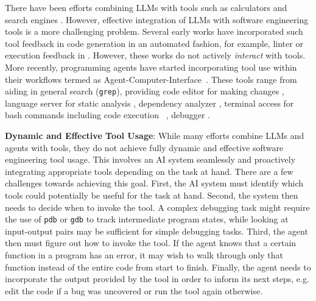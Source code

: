 There have been efforts combining LLMs with tools such as calculators and search engines \citep{schick2023toolformer, patil2023gorilla}. 
However, effective integration of LLMs with software engineering tools is a more challenging problem. 
Several early works have incorporated such tool feedback in code generation in an automated fashion, for example, linter or execution feedback in \citep{olausson2023self, zhong2024ldb, gehring2024rlef}.
However, these works do not actively \textit{interact} with tools. 
More recently, programming agents have started incorporating tool use within their workflows termed as Agent-Computer-Interface~\citep{yang2024sweagent}. 
These tools range from aiding in general search (\texttt{grep}), providing code editor for making changes \citep{openhands,claude35swebench}, language server for static analysis \citep{liu2024marscode},
dependency analyzer \citep{bairi2024codeplan}, terminal access for bash commands including code execution ~\citep{yang2024sweagent}, debugger \citep{bigsleep}. 



\textbf{Dynamic and Effective Tool Usage}: While many efforts combine LLMs and agents with tools, they do not achieve fully dynamic and effective software engineering tool usage. This involves an AI system seamlessly and proactively integrating appropriate tools depending on the task at hand. There are a few challenges towards achieving this goal. First, the AI system must identify which tools could potentially be useful for the task at hand. Second, the system then needs to decide when to invoke the tool. A complex debugging task might require the use of \texttt{pdb} or \texttt{gdb} to track intermediate program states, while looking at input-output pairs may be sufficient for simple debugging tasks. Third, the agent then must figure out how to invoke the tool. If the agent knows that a certain function in a program has an error, it may wish to walk through only that function instead of the entire code from start to finish. Finally, the agent needs to incorporate the output provided by the tool in order to inform its next steps, e.g. edit the code if a bug was uncovered or run the tool again otherwise.


